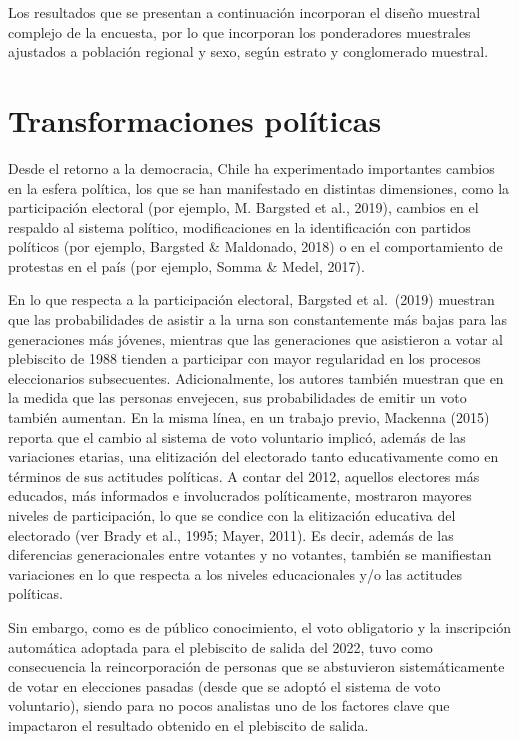 \documentclass[
  12pt,
]{book}
\begin{document}
Los resultados que se presentan a continuación incorporan el diseño muestral complejo de la encuesta, por lo que incorporan los ponderadores muestrales ajustados a población regional y sexo, según estrato y conglomerado muestral.

\hypertarget{transformaciones-poluxedticas}{%
\chapter{Transformaciones políticas}\label{transformaciones-poluxedticas}}

Desde el retorno a la democracia, Chile ha experimentado importantes cambios en la esfera política, los que se han manifestado en distintas dimensiones, como la participación electoral (por ejemplo, M. Bargsted et al., 2019), cambios en el respaldo al sistema político, modificaciones en la identificación con partidos políticos (por ejemplo, Bargsted \& Maldonado, 2018) o en el comportamiento de protestas en el país (por ejemplo, Somma \& Medel, 2017).

En lo que respecta a la participación electoral, Bargsted et al.~(2019) muestran que las probabilidades de asistir a la urna son constantemente más bajas para las generaciones más jóvenes, mientras que las generaciones que asistieron a votar al plebiscito de 1988 tienden a participar con mayor regularidad en los procesos eleccionarios subsecuentes. Adicionalmente, los autores también muestran que en la medida que las personas envejecen, sus probabilidades de emitir un voto también aumentan. En la misma línea, en un trabajo previo, Mackenna (2015) reporta que el cambio al sistema de voto voluntario implicó, además de las variaciones etarias, una elitización del electorado tanto educativamente como en términos de sus actitudes políticas. A contar del 2012, aquellos electores más educados, más informados e involucrados políticamente, mostraron mayores niveles de participación, lo que se condice con la elitización educativa del electorado (ver Brady et al., 1995; Mayer, 2011). Es decir, además de las diferencias generacionales entre votantes y no votantes, también se manifiestan variaciones en lo que respecta a los niveles educacionales y/o las actitudes políticas.

Sin embargo, como es de público conocimiento, el voto obligatorio y la inscripción automática adoptada para el plebiscito de salida del 2022, tuvo como consecuencia la reincorporación de personas que se abstuvieron sistemáticamente de votar en elecciones pasadas (desde que se adoptó el sistema de voto voluntario), siendo para no pocos analistas uno de los factores clave que impactaron el resultado obtenido en el plebiscito de salida.
\end{document}
